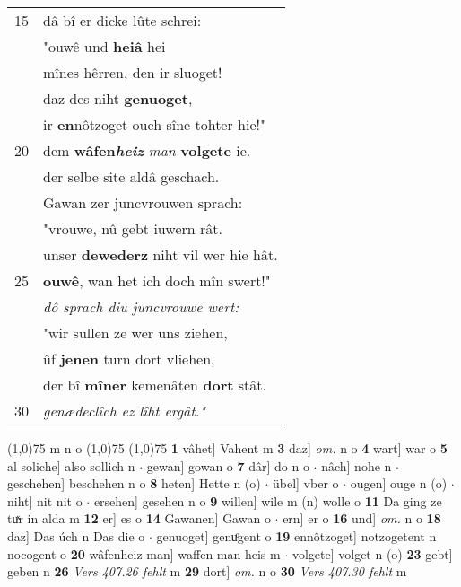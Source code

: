 \documentclass[8pt,a4paper,notitlepage]{article}
\begin{document}
\begin{table}[ht]
\begin{minipage}[t]{0.5\linewidth}
\begin{tabular}{rl}
15 & dâ bî er dicke lûte schrei:\\ 
 & "ouwê und \textbf{heiâ} hei\\ 
 & mînes hêrren, den ir sluoget!\\ 
 & daz des niht \textbf{genuoget},\\ 
 & ir \textbf{en}nôtzoget ouch sîne tohter hie!"\\ 
20 & dem \textbf{wâfen\textit{heiz}} \textit{man} \textbf{volgete} ie.\\ 
 & der selbe site aldâ geschach.\\ 
 & Gawan zer juncvrouwen sprach:\\ 
 & "vrouwe, nû gebt iuwern rât.\\ 
 & unser \textbf{dewederz} niht vil wer hie hât.\\ 
25 & \textbf{ouwê}, wan het ich doch mîn swert!"\\ 
 & \textit{dô sprach diu juncvrouwe wert:}\\ 
 & "wir sullen ze wer uns ziehen,\\ 
 & ûf \textbf{jenen} turn dort vliehen,\\ 
 & der bî \textbf{mîner} kemenâten \textbf{dort} stât.\\ 
30 & \textit{genædeclîch ez lîht ergât."}\\ 
\end{tabular}
\scriptsize
\line(1,0){75} \newline
m n o \newline
\line(1,0){75} \newline
\newline
\line(1,0){75} \newline
\textbf{1} vâhet] Vahent m \textbf{3} daz] \textit{om.} n o \textbf{4} wart] war o \textbf{5} al soliche] also sollich n  $\cdot$ gewan] gowan o \textbf{7} dâr] do n o  $\cdot$ nâch] nohe n  $\cdot$ geschehen] beschehen n o \textbf{8} heten] Hette n (o)  $\cdot$ übel] vber o  $\cdot$ ougen] ouge n (o)  $\cdot$ niht] nit nit o  $\cdot$ ersehen] gesehen n o \textbf{9} willen] wile m (n) wolle o \textbf{11} Da ging ze tuͯr in alda m \textbf{12} er] es o \textbf{14} Gawanen] Gawan o  $\cdot$ ern] er o \textbf{16} und] \textit{om.} n o \textbf{18} daz] Das úch n Das die o  $\cdot$ genuoget] genuͦgent o \textbf{19} ennôtzoget] notzogetent n nocogent o \textbf{20} wâfenheiz man] waffen man heis m  $\cdot$ volgete] volget n (o) \textbf{23} gebt] geben n \textbf{26} \textit{Vers 407.26 fehlt} m  \textbf{29} dort] \textit{om.} n o \textbf{30} \textit{Vers 407.30 fehlt} m  \newline
\end{minipage}
\end{table}
\end{document}
